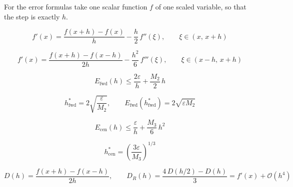 \documentclass[11pt,a4paper]{article}
\begin{document}
For the error formulas take one scalar function $f$ of one scaled variable, so that the
step is exactly $h$.

\begin{equation}
  f'(x) = \frac{f(x+h) - f(x)}{h} - \frac{h}{2}\,f''(\xi), \qquad \xi \in (x,\,x+h)
  \label{eq:fd-forward-truncation}
\end{equation}

\begin{equation}
  f'(x) = \frac{f(x+h) - f(x-h)}{2h} - \frac{h^{2}}{6}\,f'''(\xi), \qquad \xi \in (x-h,\,x+h)
  \label{eq:fd-central-truncation}
\end{equation}

\begin{equation}
  E_{\mathrm{fwd}}(h) \le \frac{2\varepsilon}{h} + \frac{M_2}{2}\,h
  \label{eq:error-forward}
\end{equation}

\begin{equation}
  h^{*}_{\mathrm{fwd}} = 2\sqrt{\frac{\varepsilon}{M_2}},
  \qquad E_{\mathrm{fwd}}(h^{*}_{\mathrm{fwd}}) = 2\sqrt{\varepsilon M_2}
  \label{eq:h-opt-forward}
\end{equation}

\begin{equation}
  E_{\mathrm{cen}}(h) \le \frac{\varepsilon}{h} + \frac{M_3}{6}\,h^{2}
  \label{eq:error-central}
\end{equation}

\begin{equation}
  h^{*}_{\mathrm{cen}} = \left(\frac{3\varepsilon}{M_3}\right)^{1/3}
  \label{eq:h-opt-central}
\end{equation}

\begin{equation}
  D(h) = \frac{f(x+h) - f(x-h)}{2h}, \qquad
  D_{R}(h) = \frac{4\,D(h/2) - D(h)}{3} = f'(x) + \mathcal{O}(h^{4})
  \label{eq:richardson}
\end{equation}
\end{document}
